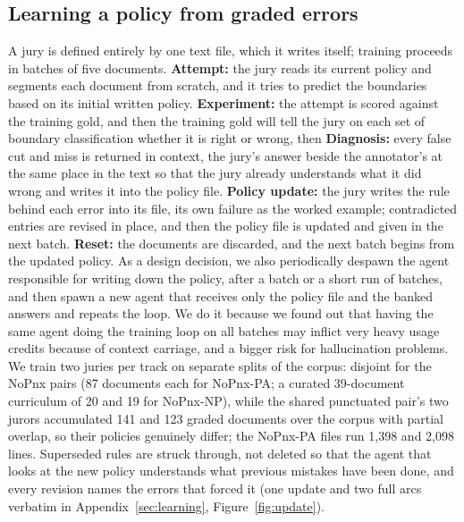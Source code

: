 \documentclass[11pt]{article}
\begin{document}
\subsection{Learning a policy from graded errors}
\label{sec:loop}
A jury is defined entirely by one text file, which it writes itself; training
proceeds in batches of five documents. \textbf{Attempt:} the jury reads its current
policy and segments each document from scratch, and it tries to predict the
boundaries based on its initial written policy. \textbf{Experiment:} the attempt is
scored against the training gold, and then the training gold will tell the jury on
each set of boundary classification whether it is right or wrong, then
\textbf{Diagnosis:} every false cut and miss is returned in context, the jury's
answer beside the annotator's at the same place in the text so that the jury already
understands what it did wrong and writes it into the policy file. \textbf{Policy
update:} the jury writes the rule behind each error into its file, its own failure as
the worked example; contradicted entries are revised in place, and then the policy
file is updated and given in the next batch. \textbf{Reset:} the documents are
discarded, and the next batch begins from the updated policy. As a design decision,
we also periodically despawn the agent responsible for writing down the policy,
after a batch or a short run of batches, and then spawn a new agent that receives
only the policy file and the banked answers and repeats the loop. We do it because
we found out that having the same agent doing the training loop on all batches may
inflict very heavy usage credits because of context carriage, and a bigger risk for
hallucination problems. We train two juries per track on separate splits of the corpus: disjoint for
the NoPnx pairs (87 documents each for NoPnx-PA; a curated 39-document curriculum of
20 and 19 for NoPnx-NP), while the shared punctuated pair's two jurors accumulated
141 and 123 graded documents over the corpus with partial overlap, so their policies
genuinely differ; the NoPnx-PA files run 1{,}398 and 2{,}098
lines. Superseded rules are struck through, not deleted so that the agent that looks
at the new policy understands what previous mistakes have been done, and every
revision names the errors that forced it (one update and two full arcs verbatim in
Appendix~\ref{sec:learning}, Figure~\ref{fig:update}).
\end{document}
